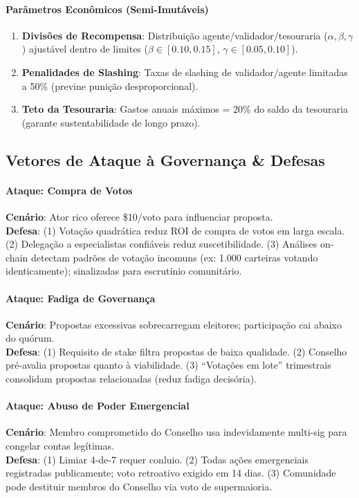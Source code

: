\documentclass[11pt]{article}
\begin{document}
\begin{itemize}[noitemsep]
\begin{itemize}[noitemsep]
\begin{itemize}[noitemsep]
\paragraph{Parâmetros Econômicos (Semi-Imutáveis)}
\begin{enumerate}[noitemsep]
  \item \textbf{Divisões de Recompensa}: Distribuição agente/validador/tesouraria ($\alpha, \beta, \gamma$) ajustável dentro de limites ($\beta \in [0.10, 0.15]$, $\gamma \in [0.05, 0.10]$).
  \item \textbf{Penalidades de Slashing}: Taxas de slashing de validador/agente limitadas a 50\% (previne punição desproporcional).
  \item \textbf{Teto da Tesouraria}: Gastos anuais máximos = 20\% do saldo da tesouraria (garante sustentabilidade de longo prazo).
\end{enumerate}

\subsection{Vetores de Ataque à Governança \& Defesas}

\paragraph{Ataque: Compra de Votos}
\textbf{Cenário}: Ator rico oferece \$10/voto para influenciar proposta.\\
\textbf{Defesa}: (1) Votação quadrática reduz ROI de compra de votos em larga escala. (2) Delegação a especialistas confiáveis reduz suscetibilidade. (3) Análises on-chain detectam padrões de votação incomuns (ex: 1.000 carteiras votando identicamente); sinalizadas para escrutínio comunitário.

\paragraph{Ataque: Fadiga de Governança}
\textbf{Cenário}: Propostas excessivas sobrecarregam eleitores; participação cai abaixo do quórum.\\
\textbf{Defesa}: (1) Requisito de stake filtra propostas de baixa qualidade. (2) Conselho pré-avalia propostas quanto à viabilidade. (3) ``Votações em lote'' trimestrais consolidam propostas relacionadas (reduz fadiga decisória).

\paragraph{Ataque: Abuso de Poder Emergencial}
\textbf{Cenário}: Membro comprometido do Conselho usa indevidamente multi-sig para congelar contas legítimas.\\
\textbf{Defesa}: (1) Limiar 4-de-7 requer conluio. (2) Todas ações emergenciais registradas publicamente; voto retroativo exigido em 14 dias. (3) Comunidade pode destituir membros do Conselho via voto de supermaioria.


\end{itemize}
\end{itemize}
\end{itemize}
\end{document}
